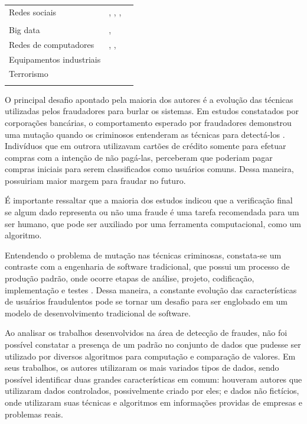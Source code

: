 \documentclass[smallextended]{svjour3}
\begin{document}
\begin{table}
\begin{tabular}[!Ht]{lll}
		Redes sociais & \cite{Yu2016}, \cite{Liu2015}, \cite{Feily2009},  &  \\
		& \cite{Rebahi2011} &  \\
		
		Big data & \cite{Sharma2015}, \cite{Mahmood2013} &  \\
		
		Redes de computadores & \cite{Allan2010}, \cite{Branco2016}, \cite{Akoglu2015}  &  \\
		
		Equipamentos industriais & \cite{Bauder2016} &  \\
		
		Terrorismo & \cite{Allan2010} &  \\
		\noalign{\smallskip}\hline
	\end{tabular}
\end{table}

O principal desafio apontado pela maioria dos autores é a evolução das técnicas utilizadas pelos fraudadores para burlar os sistemas. Em estudos constatados por corporações bancárias, o comportamento esperado por fraudadores demonstrou uma mutação quando os criminosos entenderam as técnicas para detectá-los \citep{Bolton2002}. Indivíduos que em outrora utilizavam cartões de crédito somente para efetuar compras com a intenção de não pagá-las, perceberam que poderiam pagar compras iniciais para serem classificados como usuários comuns. Dessa maneira, possuiriam maior margem para fraudar no futuro.

É importante ressaltar que a maioria dos estudos indicou que a verificação final se algum dado representa ou não uma fraude é uma tarefa recomendada para um ser humano, que pode ser auxiliado por uma ferramenta computacional, como um algoritmo. 

Entendendo o problema de mutação nas técnicas criminosas, constata-se um contraste com a engenharia de software tradicional, que possui um processo de produção padrão, onde ocorre etapas de análise, projeto, codificação, implementação e testes \citep{sommervillesoftware}. Dessa maneira, a constante evolução das características de usuários fraudulentos pode se tornar um desafio para ser englobado em um modelo de desenvolvimento tradicional de software. 

Ao analisar os trabalhos desenvolvidos na área de detecção de fraudes, não foi possível constatar a presença de um padrão no conjunto de dados que pudesse ser utilizado por diversos algoritmos para computação e comparação de valores. Em seus trabalhos, os autores utilizaram os mais variados tipos de dados, sendo possível identificar duas grandes características em comum: houveram autores que utilizaram dados controlados, possivelmente criado por eles; e dados não fictícios, onde utilizaram suas técnicas e algoritmos em informações providas de empresas e problemas reais. 
\end{document}
